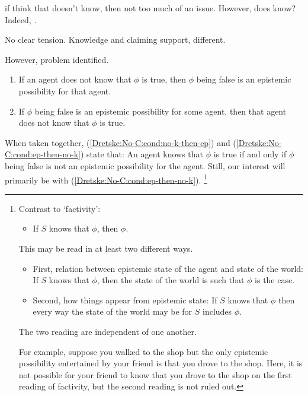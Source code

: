 \begin{note}
  if think that doesn't know, then not too much of an issue.
  However, does know?
  Indeed, \citeauthor{Dretske:1970to}.

  No clear tension.
  Knowledge and claiming support, different.

  However, problem identified.
\end{note}

\begin{note}
  \begin{enumerate}[label=K\Alph*., ref=K\Alph*]
  \item\label{Dretske:No-C:cond:no-k-then-ep} If an agent does not know that \(\phi\) is true, then \(\phi\) being false is an epistemic possibility for that agent.
  \item\label{Dretske:No-C:cond:ep-then-no-k} If \(\phi\) being false is an epistemic possibility for some agent, then that agent does not know that \(\phi\) is true.
  \end{enumerate}
  When taken together, (\ref{Dretske:No-C:cond:no-k-then-ep}) and (\ref{Dretske:No-C:cond:ep-then-no-k}) state that: An agent knows that \(\phi\) is true if and only if \(\phi\) being false is not an epistemic possibility for the agent.
  Still, our interest will primarily be with (\ref{Dretske:No-C:cond:ep-then-no-k}).\nolinebreak
  \footnote{
    \label{fn:factivity-two-readings}
    Contrast to `factivity':
    \begin{itemize}
    \item If \(S\) knows that \(\phi\), then \(\phi\).
    \end{itemize}
    This may be read in at least two different ways.
    \begin{itemize}
    \item First, relation between epistemic state of the agent and state of the world:\newline
      \mbox{} \qquad If \(S\) knows that \(\phi\), then the state of the world is such that \(\phi\) is the case.
    \item Second, how things appear from epistemic state:\newline
      \mbox{} \qquad If \(S\) knows that \(\phi\) then every way the state of the world may be for \(S\) includes \(\phi\).
    \end{itemize}

    The two reading are independent of one another.

    For example, suppose you walked to the shop but the only epistemic possibility entertained by your friend is that you drove to the shop.
    Here, it is not possible for your friend to know that you drove to the shop on the first reading of factivity, but the second reading is not ruled out.

}
\end{note}
